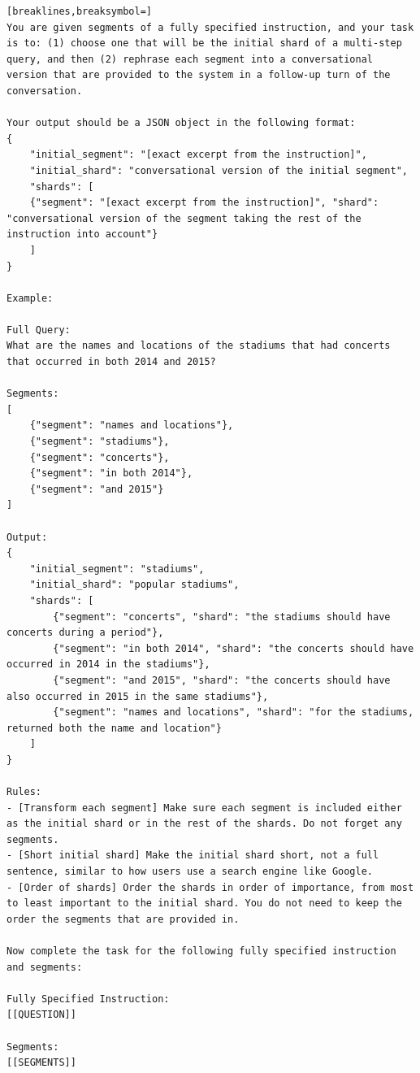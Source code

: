 \newpage
\begin{tcolorbox}[title=Rephrasing]
{\footnotesize
\begin{Verbatim}[breaklines,breaksymbol=]
You are given segments of a fully specified instruction, and your task is to: (1) choose one that will be the initial shard of a multi-step query, and then (2) rephrase each segment into a conversational version that are provided to the system in a follow-up turn of the conversation.

Your output should be a JSON object in the following format:
{
    "initial_segment": "[exact excerpt from the instruction]",
    "initial_shard": "conversational version of the initial segment",
    "shards": [
    {"segment": "[exact excerpt from the instruction]", "shard": "conversational version of the segment taking the rest of the instruction into account"}
    ]
}

Example:

Full Query:
What are the names and locations of the stadiums that had concerts that occurred in both 2014 and 2015?

Segments:
[
    {"segment": "names and locations"},
    {"segment": "stadiums"},
    {"segment": "concerts"},
    {"segment": "in both 2014"},
    {"segment": "and 2015"}
]

Output:
{
    "initial_segment": "stadiums",
    "initial_shard": "popular stadiums",
    "shards": [
        {"segment": "concerts", "shard": "the stadiums should have concerts during a period"},
        {"segment": "in both 2014", "shard": "the concerts should have occurred in 2014 in the stadiums"},
        {"segment": "and 2015", "shard": "the concerts should have also occurred in 2015 in the same stadiums"},
        {"segment": "names and locations", "shard": "for the stadiums, returned both the name and location"}
    ]
}

Rules:
- [Transform each segment] Make sure each segment is included either as the initial shard or in the rest of the shards. Do not forget any segments.
- [Short initial shard] Make the initial shard short, not a full sentence, similar to how users use a search engine like Google.
- [Order of shards] Order the shards in order of importance, from most to least important to the initial shard. You do not need to keep the order the segments that are provided in.

Now complete the task for the following fully specified instruction and segments:

Fully Specified Instruction:
[[QUESTION]]

Segments:
[[SEGMENTS]]

\end{Verbatim}
}
\end{tcolorbox}


